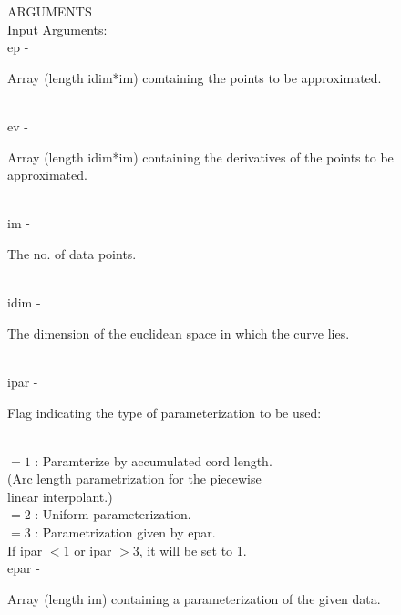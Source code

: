 ARGUMENTS\\
	\>Input Arguments:\\
        \>\>    {\fov ep}\> - \>  \begin{minipg2}
                     Array (length idim*im) comtaining the points
                  to be approximated.
                               \end{minipg2}\\[0.8ex]
        \>\>    {\fov ev}\> - \>  \begin{minipg2}
                     Array (length idim*im) containing the derivatives
                  of the points to be approximated.
                               \end{minipg2}\\[0.8ex]
        \>\>    {\fov im}\> - \>  \begin{minipg2}
                     The no. of data points.
                               \end{minipg2}\\
        \>\>    {\fov idim}\> - \>  \begin{minipg2}
                     The dimension of the euclidean space in which the
                  curve lies.
                               \end{minipg2}\\[0.8ex]
        \>\>    {\fov ipar}\> - \> \begin{minipg2}
                     Flag indicating the type of parameterization to be used:
                               \end{minipg2}\\[0.8ex]
                \>\>\>\>   $= 1$ : Paramterize by accumulated cord length.\\
                \>\>\>\>         (Arc length parametrization for the piecewise\\
                \>\>\>\>         linear interpolant.)\\
                \>\>\>\>   $= 2$ : Uniform parameterization.\\
                \>\>\>\>   $= 3$ : Parametrization given by epar.\\
                \>\>\>\>  If ipar $<1$  or ipar $>3$, it will be set to 1.\\
        \>\>    {\fov epar}\> - \>  \begin{minipg2}
                     Array (length im) containing a parameterization
                  of the given data.
                               \end{minipg2}\\[0.8ex]
